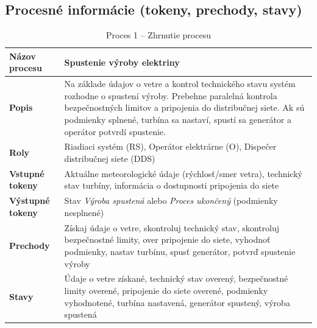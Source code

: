 \documentclass[12pt,a4paper]{article}
\begin{document}
\subsection{Procesné informácie (tokeny, prechody, stavy)}
\begin{table}[H]
  \centering
  \renewcommand{\arraystretch}{1.2}
  \begin{tabularx}{\textwidth}{|p{}|X|}
    \hline
    \textbf{Názov procesu} & Spustenie výroby elektriny \\
    \hline
    \textbf{Popis} & Na základe údajov o vetre a kontrol technického stavu systém rozhodne o spustení výroby. Prebehne paralelná kontrola bezpečnostných limitov a pripojenia do distribučnej siete. Ak sú podmienky splnené, turbína sa nastaví, spustí sa generátor a operátor potvrdí spustenie. \\
    \hline
    \textbf{Roly} & Riadiaci systém (RS), Operátor elektrárne (O), Dispečer distribučnej siete (DDS) \\
    \hline
    \textbf{Vstupné tokeny} & Aktuálne meteorologické údaje (rýchlosť/smer vetra), technický stav turbíny, informácia o dostupnosti pripojenia do siete \\
    \hline
    \textbf{Výstupné tokeny} & Stav \emph{Výroba spustená} alebo \emph{Proces ukončený} (podmienky nesplnené) \\
    \hline
    \textbf{Prechody} & Získaj údaje o vetre, skontroluj technický stav, skontroluj bezpečnostné limity, over pripojenie do siete, vyhodnoť podmienky, nastav turbínu, spusť generátor, potvrď spustenie výroby \\
    \hline
    \textbf{Stavy} & Údaje o vetre získané, technický stav overený, bezpečnostné limity overené, pripojenie do siete overené, podmienky vyhodnotené, turbína nastavená, generátor spustený, výroba spustená \\
    \hline
  \end{tabularx}
  \caption{Proces 1 -- Zhrnutie procesu}
\end{table}
\end{document}
